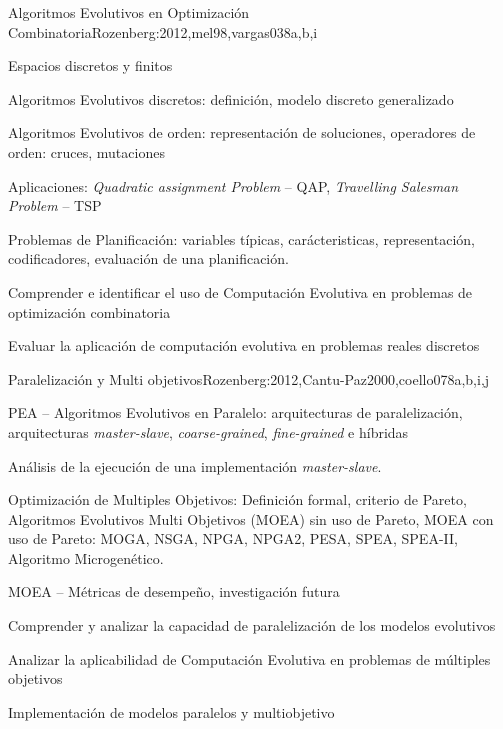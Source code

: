 \begin{syllabus}
\begin{unit}{Algoritmos Evolutivos en Optimización Combinatoria}{Rozenberg:2012,mel98,vargas03}{8}{a,b,i}
\begin{topics}
  \item Espacios discretos y finitos
	\item Algoritmos Evolutivos discretos: definición, modelo discreto generalizado
  \item Algoritmos Evolutivos de orden: representación de soluciones, operadores de orden: cruces, mutaciones
	\item Aplicaciones: {\it Quadratic assignment Problem} -- QAP, {\it Travelling Salesman Problem} -- TSP
	\item Problemas de Planificación: variables típicas, carácteristicas, representación, codificadores, evaluación de una planificación. 
\end{topics}
\begin{learningoutcomes}
  \item Comprender e identificar el uso de Computación Evolutiva en problemas de optimización combinatoria
  \item Evaluar la aplicación de computación evolutiva en problemas reales discretos
\end{learningoutcomes}
\end{unit}

\begin{unit}{Paralelización y Multi objetivos}{Rozenberg:2012,Cantu-Paz2000,coello07}{8}{a,b,i,j}
\begin{topics}
  \item PEA -- Algoritmos Evolutivos en Paralelo: arquitecturas de paralelización, arquitecturas {\it master-slave}, {\it coarse-grained}, {\it fine-grained} e híbridas 
  \item Análisis de la ejecución de una implementación {\it master-slave}.
  \item Optimización de Multiples Objetivos: Definición formal, criterio de Pareto, Algoritmos Evolutivos Multi Objetivos (MOEA) sin uso de Pareto, MOEA con uso de Pareto: MOGA, NSGA, NPGA, NPGA2, PESA, SPEA, SPEA-II, Algoritmo Microgenético. 
	\item MOEA -- Métricas de desempeño, investigación futura
\end{topics}
\begin{learningoutcomes}
  \item Comprender y analizar la capacidad de paralelización de los modelos evolutivos
  \item Analizar la aplicabilidad de Computación Evolutiva en problemas de múltiples objetivos
  \item Implementación de modelos paralelos y multiobjetivo
\end{learningoutcomes}
\end{unit}


\end{syllabus}
